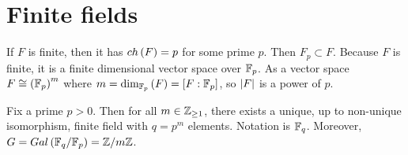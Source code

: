 \pagebreak

\section{Finite fields}


If $ F $ is finite, then it has $ ch\left( F \right) = p $ for some prime $ p $. Then $ F_p \subset F $. Because $ F $ is finite, it is a finite dimensional vector space over $ \mathbb{F}_p $. As a vector space $ F \cong \left( \mathbb{F}_p \right)^m $ where $ m = \dim_{\mathbb{F}_p}\left( F \right) = \left[ F : \mathbb{F}_p \right] $, so $ \left\lvert F \right\rvert $ is a power of $ p $.

\begin{theorem}
Fix a prime $ p > 0 $. Then for all $ m \in \mathbb{Z}_{\ge 1} $, there exists a unique, up to non-unique isomorphism, finite field with $ q = p^m $ elements. Notation is $ \mathbb{F}_q $. Moreover, $ G = Gal\left( \mathbb{F}_q / \mathbb{F}_p \right) = \mathbb{Z} / m\mathbb{Z} $.
\end{theorem}

